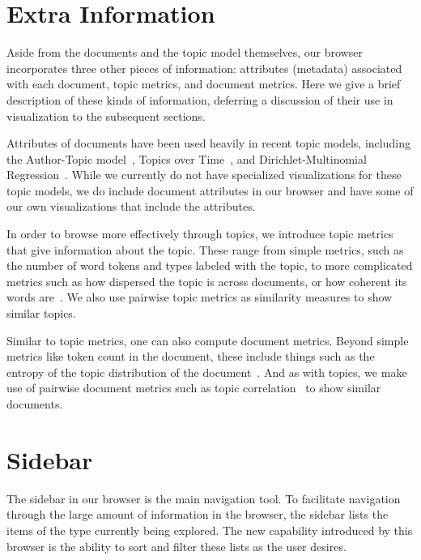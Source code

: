 \documentclass{article}
\begin{document}
\section{Extra Information}

Aside from the documents and the topic model themselves, our browser
incorporates three other pieces of information: attributes (metadata)
associated with each document, topic metrics, and document metrics.  Here we
give a brief description of these kinds of information, deferring a discussion
of their use in visualization to the subsequent sections.

Attributes of documents have been used heavily in recent topic models,
including the Author-Topic model~\cite{rosen-zvi-2004-author-topic-model},
Topics over Time~\cite{wang-2006-topics-over-time}, and Dirichlet-Multinomial
Regression~\cite{mimno-2008-topic-models-with-arbitrary-features-dmr}.  While
we currently do not have specialized visualizations for these topic models, we
do include document attributes in our browser and have some of our own 
visualizations that include the attributes.

In order to browse more effectively through topics, we introduce topic metrics
that give information about the topic.  These range from simple metrics, such
as the number of word tokens and types labeled with the topic, to more
complicated metrics such as how dispersed the topic is across documents, or how
coherent its words
are~\cite{newman-2010-automatic-evaluation-of-topic-coherence}.  We also use
pairwise topic metrics as similarity measures to show similar topics.

Similar to topic metrics, one can also compute document metrics.  Beyond simple
metrics like token count in the document, these include things such as the
entropy of the topic distribution of the
document~\cite{misra-2008-lda-to-find-semantically-incoherent-documents}.  And
as with topics, we make use of pairwise document metrics such as topic
correlation~\cite{blei-2009-topic-models} to show similar documents.

\section{Sidebar}

The sidebar in our browser is the main navigation tool.  To facilitate
navigation through the large amount of information in the browser, the sidebar
lists the items of the type currently being explored.  The new capability
introduced by this browser is the ability to sort and filter these lists as the
user desires.
\end{document}
